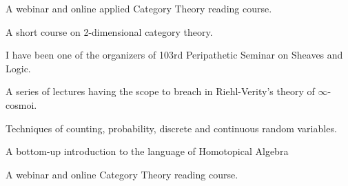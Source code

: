 \begin{eyenumerate}
   \item {}
   {A webinar and online applied Category Theory reading course.}%
   \item {}
   {A short course on 2-dimensional category theory.}%
   \item {}
   {I have been one of the organizers of 103rd Peripathetic Seminar on Sheaves and Logic.}%
   \item {}
   {A series of lectures having the scope to breach in Riehl-Verity's theory of $\infty$-cosmoi.}%
   \item {}
   {Techniques of counting, probability, discrete and continuous random variables.}
   \item {}
   {A bottom-up introduction to the language of Homotopical Algebra}%
   \item {}
   {A webinar and online Category Theory reading course.}%
\end{eyenumerate}
